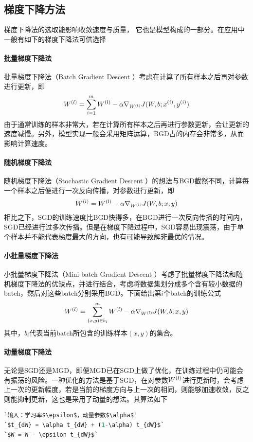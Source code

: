 \subsection{梯度下降方法}
梯度下降法的选取能影响收敛速度与质量，	它也是模型构成的一部分。在应用中一般有如下的梯度下降法可供选择
\paragraph{批量梯度下降法}
批量梯度下降法（Batch Gradient Descent ）考虑在计算了所有样本之后再对参数进行更新，即
\begin{eqnarray}
{W}^{({l})}=\sum_{i=1}^m{W}^{({l})}-\alpha\nabla_{{W}^{({l})}}J(W,b;{x}^{({i})},{y}^{({i})})
\end{eqnarray} 
由于通常训练的样本非常大，若在计算所有样本之后再进行参数更新，会让更新的速度减慢。另外，模型实现一般会采用矩阵运算，BGD占的内存会非常多，从而影响计算速度。
\paragraph{随机梯度下降法}
随机梯度下降法（Stochastic Gradient Descent ）的想法与BGD截然不同，计算每一个样本之后便进行一次反向传播，对参数进行更新，即
\begin{eqnarray}
{W}^{({l})}={W}^{({l})}-\alpha\nabla_{{W}^{({l})}}J(W,b;x,y)
\end{eqnarray}
相比之下，SGD的训练速度比BGD快得多，在BGD进行一次反向传播的时间内，SGD已经进行过多次传播。但是在梯度下降过程中，SGD容易出现震荡，由于单个样本并不能代表梯度最大的方向，也有可能导致解非最优的情况。
\paragraph{小批量梯度下降法}
小批量梯度下降法（Mini-batch Gradient Descent ）考虑了批量梯度下降法和随机梯度下降法的优缺点，并进行结合，考虑将数据集划分成多个含有较小数据的batch，然后对这些batch分别采用BGD。下面给出第$i$个batch的训练公式
\begin{eqnarray}
{W}^{({l})}=\sum_{(x,y)\in b_i}^m{W}^{({l})}-\alpha\nabla_{{W}^{({l})}}J(W,b;x,y)
\end{eqnarray}
其中，$b_i$代表当前batch所包含的训练样本$(x,y)$的集合。
\paragraph{动量梯度下降法}
无论是SGD还是MGD，即便MGD已在SGD上做了优化，在训练过程中仍可能会有振荡的风险。一种优化的方法是基于SGD，在对参数${W}^{({l})}$进行更新时，会考虑上一次的更新幅度，若是当前的梯度方向与上一次的相同，则能够加速收敛，反之则能抑制更新，这也是采用了动量的想法。其算法如下
\begin{lstlisting}[language=python]
`输入：学习率$\epsilon$，动量参数$\alpha$`
`$t_{dW} = \alpha t_{dW} + (1-\alpha) t_{dW}$`
`$W = W - \epsilon t_{dW}$`
\end{lstlisting}

